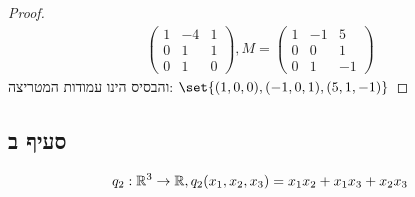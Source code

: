 \documentclass{article}
\DeclarePairedDelimiter\set\{\}
\begin{document}
\begin{proof}
\begin{align*}
\begin{pmatrix}
                        1 & -4 & 1 \\
                        0 & 1 & 1 \\
                        0 & 1 & 0
                \end{pmatrix},
                M = \begin{pmatrix}
                    1 & -1 & 5 \\
                    0 & 0 & 1 \\
                    0 & 1 & -1
                    \end{pmatrix}
        \end{align*}
        והבסיס הינו עמודות המטריצה: $\set{(1,0,0), (-1,0,1), (5,1,-1)}$
    \end{proof}

    \pagebreak
    \subsection*{סעיף ב}
    \[
     q_2: \mathbb{R}^3 \rightarrow \mathbb{R}, q_2(x_1, x_2, x_3) = x_1 x_2 + x_1 x_3 + x_2 x_3
    \]
\end{document}
